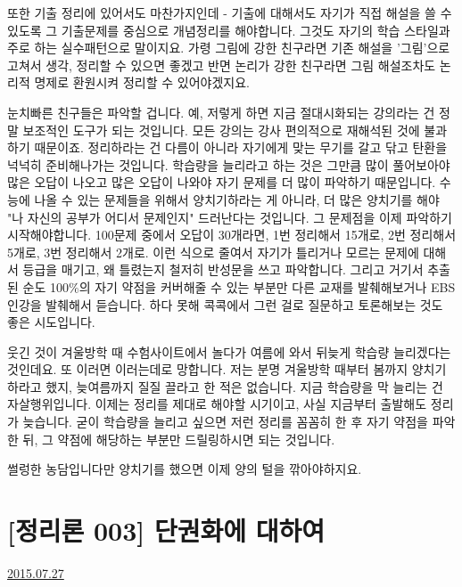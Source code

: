또한 기출 정리에 있어서도 마찬가지인데 - 기출에 대해서도 자기가 직접 해설을 쓸 수 있도록 그 기출문제를 중심으로 개념정리를 해야합니다.
그것도 자기의 학습 스타일과 주로 하는 실수패턴으로 말이지요.
가령 그림에 강한 친구라면 기존 해설을 '그림'으로 고쳐서 생각, 정리할 수 있으면 좋겠고
반면 논리가 강한 친구라면 그림 해설조차도 논리적 명제로 환원시켜 정리할 수 있어야겠지요.
\vspace{5mm}

눈치빠른 친구들은 파악할 겁니다. 예, 저렇게 하면 지금 절대시화되는 강의라는 건 정말 보조적인 도구가 되는 것입니다.
모든 강의는 강사 편의적으로 재해석된 것에 불과하기 때문이죠.
정리하라는 건 다름이 아니라 자기에게 맞는 무기를 갈고 닦고 탄환을 넉넉히 준비해나가는 것입니다.
학습량을 늘리라고 하는 것은 그만큼 많이 풀어보아야 많은 오답이 나오고 많은 오답이 나와야 자기 문제를 더 많이 파악하기 때문입니다.
수능에 나올 수 있는 문제들을 위해서 양치기하라는 게 아니라, 더 많은 양치기를 해야 "나 자신의 공부가 어디서 문제인지" 드러난다는 것입니다.
그 문제점을 이제 파악하기 시작해야합니다. 100문제 중에서 오답이 30개라면, 1번 정리해서 15개로, 2번 정리해서 5개로, 3번 정리해서 2개로.
이런 식으로 줄여서 자기가 틀리거나 모르는 문제에 대해서 등급을 매기고, 왜 틀렸는지 철저히 반성문을 쓰고 파악합니다.
그리고 거기서 추출된 순도 100$\%$의 자기 약점을 커버해줄 수 있는 부분만 다른 교재를 발췌해보거나 EBS 인강을 발췌해서 듣습니다.
하다 못해 콕콕에서 그런 걸로 질문하고 토론해보는 것도 좋은 시도입니다.
\vspace{5mm}

웃긴 것이 겨울방학 때 수험사이트에서 놀다가 여름에 와서 뒤늦게 학습량 늘리겠다는 것인데요. 또 이러면 이러는데로 망합니다.
저는 분명 겨울방학 때부터 봄까지 양치기하라고 했지, 늦여름까지 질질 끌라고 한 적은 없습니다.
지금 학습량을 막 늘리는 건 자살행위입니다. 이제는 정리를 제대로 해야할 시기이고, 사실 지금부터 출발해도 정리가 늦습니다.
굳이 학습량을 늘리고 싶으면 저런 정리를 꼼꼼히 한 후 자기 약점을 파악한 뒤, 그 약점에 해당하는 부분만 드릴링하시면 되는 것입니다.
\vspace{5mm}

썰렁한 농담입니다만 양치기를 했으면 이제 양의 털을 깎아야하지요.
\vspace{5mm}






\section{[정리론 003] 단권화에 대하여}
\href{https://www.kockoc.com/Apoc/218740}{2015.07.27}

